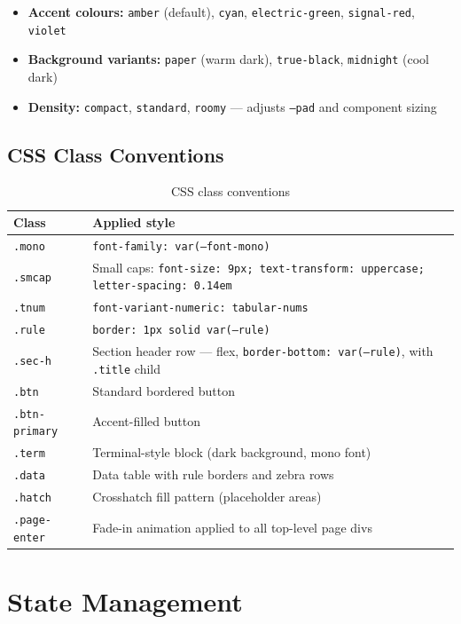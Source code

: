 \documentclass[11pt,a4paper,twoside,openright]{book}
\begin{document}
\begin{itemize}[leftmargin=*,noitemsep]
  \item \textbf{Accent colours:} \texttt{amber} (default), \texttt{cyan}, \texttt{electric-green}, \texttt{signal-red}, \texttt{violet}
  \item \textbf{Background variants:} \texttt{paper} (warm dark), \texttt{true-black}, \texttt{midnight} (cool dark)
  \item \textbf{Density:} \texttt{compact}, \texttt{standard}, \texttt{roomy} — adjusts \texttt{--pad} and component sizing
\end{itemize}

\subsection{CSS Class Conventions}

\begin{table}[H]
\centering
\begin{tabularx}{\textwidth}{L{2.5cm} X}
\toprule
\textbf{Class} & \textbf{Applied style} \\
\midrule
\texttt{.mono}    & \texttt{font-family: var(--font-mono)} \\
\texttt{.smcap}   & Small caps: \texttt{font-size: 9px; text-transform: uppercase; letter-spacing: 0.14em} \\
\texttt{.tnum}    & \texttt{font-variant-numeric: tabular-nums} \\
\texttt{.rule}    & \texttt{border: 1px solid var(--rule)} \\
\texttt{.sec-h}   & Section header row — flex, \texttt{border-bottom: var(--rule)}, with \texttt{.title} child \\
\texttt{.btn}     & Standard bordered button \\
\texttt{.btn-primary} & Accent-filled button \\
\texttt{.term}    & Terminal-style block (dark background, mono font) \\
\texttt{.data}    & Data table with rule borders and zebra rows \\
\texttt{.hatch}   & Crosshatch fill pattern (placeholder areas) \\
\texttt{.page-enter} & Fade-in animation applied to all top-level page divs \\
\bottomrule
\end{tabularx}
\caption{CSS class conventions}
\end{table}

\section{State Management}
\end{document}
